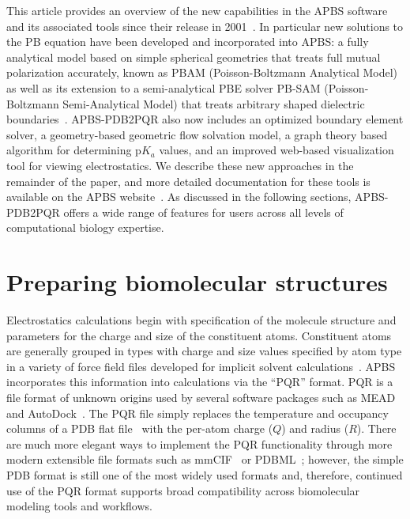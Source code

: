 \documentclass[12pt,titlepage]{article}
\newcommand{\revision}[1]{#1}
\begin{document}
This article provides an overview of the new capabilities in the APBS software and its associated tools since their release in 2001~\cite{Holst2000, Baker2000, Baker2001a, Baker2001}.
In particular new solutions to the PB equation have been developed and incorporated into APBS: a fully analytical model based on simple spherical geometries that treats full mutual polarization accurately, known as PBAM (Poisson-Boltzmann Analytical Model)~\cite{Lotan2006, Felberg2017} as well as its extension to a semi-analytical PBE solver PB-SAM (Poisson-Boltzmann Semi-Analytical Model) that treats arbitrary shaped dielectric boundaries~\cite{Yap2010, Yap2013}.
APBS-PDB2PQR also now includes an optimized boundary element solver, a geometry-based geometric flow solvation model, a graph theory based algorithm for determining p$K_a$ values, and an improved web-based visualization tool for viewing electrostatics.
We describe these new approaches in the remainder of the paper, and more detailed documentation for these tools is available on the APBS website~\cite{APBSweb}.
\revision{As discussed in the following sections, APBS-PDB2PQR offers a wide range of features for users across all levels of computational biology expertise.}

\section{Preparing biomolecular structures} \label{sec:prep}
Electrostatics calculations begin with specification of the molecule structure and parameters for the charge and size of the constituent atoms.
\revision{Constituent atoms are generally grouped in types with charge and size values specified by atom type in a variety of force field files developed for implicit solvent calculations~\cite{Ren2012}.}
APBS incorporates this information into calculations via the ``PQR'' format. PQR is a file format of unknown origins used by several software packages such as MEAD~\cite{Bashford1997} and AutoDock~\cite{Morris2009}.
The PQR file simply replaces the temperature and occupancy columns of a PDB flat file~\cite{PDBflat} with the per-atom charge ($Q$) and radius ($R$).
There are much more elegant ways to implement the PQR functionality through more modern extensible file formats such as mmCIF~\cite{mmCIF} or PDBML~\cite{PDBML}; however, the simple PDB format is still one of the most widely used formats and, therefore, continued use of the PQR format supports broad compatibility across biomolecular modeling tools and workflows.
\end{document}
